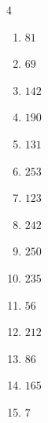 \begin{multicols}{4}
\begin{enumerate}
  \item $81$


  \item $69$


  \item $142$


  \item $190$


  \item $131$


\columnbreak %

\resetques

  \item $253$


  \item $123$


  \item $242$


  \item $250$


  \item $235$


  \item $56$


  \item $212$


  \item $86$


  \item $165$


  \item $7$



\end{enumerate}
\end{multicols}
